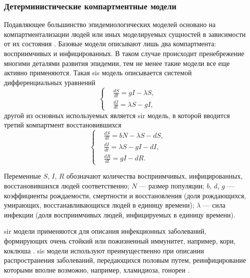 \documentclass[a4paper,12pt]{article} %
\begin{document}
\subsubsection{Детерминистические компартментные модели}

Подавляющее большинство эпидемиологических моделей основано на компартментализации людей или иных моделируемых сущностей в зависимости от их состояния \cite{keeling2005networks,kermack1927contribution,bailey1957mathematical,anderson1992may}. Базовые модели описывают лишь два компартмента: восприимчивых и инфицированных. В таком случае происходит пренебрежение многими деталями развития эпидемии, тем не менее такие модели все еще активно применяются. Такая \gls{sis} модель описывается системой дифференциальных уравнений
\begin{equation}
    \left\{
    \begin{aligned}
        & \frac{dS}{dt} = gI-\lambda S, \\
        & \frac{dI}{dt} = \lambda S - gI,
    \end{aligned}
    \right.
\end{equation}
другой из основных используемых является \gls{sir} модель, в которой вводится третий компартмент восстановившихся
\begin{equation}
    \left\{
    \begin{aligned}
    & \frac{dS}{dt}=bN-\lambda S-dS, \\
    & \frac{dI}{dt}=\lambda S-gI-dI, \\
    & \frac{dR}{dt}=gI-dR.
    \end{aligned}
    \right.
\end{equation}

Переменные $S$, $I$, $R$ обозначают количества восприимчивых, инфицированных, восстановившихся людей соответственно; $N$ --- размер популяции; $b$, $d$, $g$ --- коэффициенты рождаемости, смертности и восстановления (доля рождающихся, умирающих, восстанавливающихся людей в единицу времени); $\lambda$ --- сила инфекции (доля восприимчивых людей, инфицируемых в единицу времени).

\gls{sir} модели применяются для описания инфекционных заболеваний, формирующих очень стойкий или пожизненный иммунитет, например, кори, коклюша \cite{keeling2005networks,kermack1927contribution,anderson1992may,grenfell1992chance,rohani2000impact}. \gls{sis} модели используют преимущественно при описании распространения заболеваний, передающихся половым путем, реинфицирование которыми вполне возможно, например, хламидиоза, гонореи \cite{keeling2005networks,hethcote1984springer,garnett1996sexually}.
\end{document}

